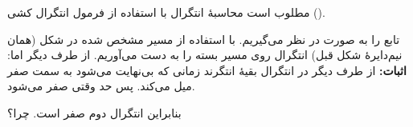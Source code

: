 \begin{EMexample}{}

مطلوب است محاسبهٔ انتگرال  با استفاده از فرمول انتگرال کشی ().

تابع  را به صورت  در نظر می‌گیریم. با استفاده از مسیر مشخص شده در شکل (همان نیم‌دایرهٔ شکل قبل) انتگرال روی مسیر بسته را به دست می‌آوریم.
از طرف دیگر
اما:
\textbf{اثبات:}
از طرف دیگر در انتگرال  بقیهٔ انتگرند زمانی که  بی‌نهایت می‌شود به سمت صفر میل می‌کند. پس حد  وقتی  صفر می‌شود.

بنابراین
انتگرال دوم صفر است. چرا؟

\end{EMexample}

